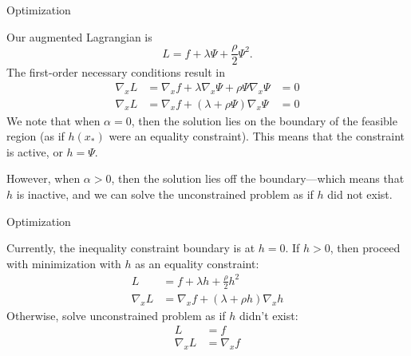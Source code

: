 \begin{frame}{Optimization} 

    Our augmented Lagrangian is 
% 
    \begin{equation}
        L = f + \lambda \Psi + \frac{\rho}{2} \Psi^2. 
    \end{equation} 
% 
    The first-order necessary conditions result in 
    \begin{align}
        \nabla_x L & = \nabla_x f + \lambda \nabla_x \Psi + \rho \Psi \nabla_x \Psi & = 0 \\ 
        \nabla_x L & = \nabla_x f + ( \lambda + \rho \Psi ) \nabla_x \Psi & = 0 
    \end{align} 
% 
    We note that when $ \alpha = 0 $, then the solution lies on the boundary of the feasible region (as if $h(x_*)$ were an equality constraint). This means that the constraint is active, or $ h = \Psi $. 

    However, when $ \alpha > 0 $, then the solution lies off the boundary---which means that $h$ is inactive, and we can solve the unconstrained problem as if $h$ did not exist. 
     
\end{frame} 

\begin{frame}{Optimization}

    Currently, the inequality constraint boundary is at $ h = 0 $. If $h > 0$, then proceed with minimization with $h$ as an equality constraint:  
% 
    \begin{align}
        L & = f + \lambda h + \frac{\rho}{2} h^2 \\ 
        \nabla_x L & = \nabla_x f + ( \lambda + \rho h ) \nabla_x h 
    \end{align}
% 
    Otherwise, solve unconstrained problem as if $h$ didn't exist: 
% 
    \begin{align}
        L & = f \\ 
        \nabla_x L & = \nabla_x f 
    \end{align}

\end{frame}

